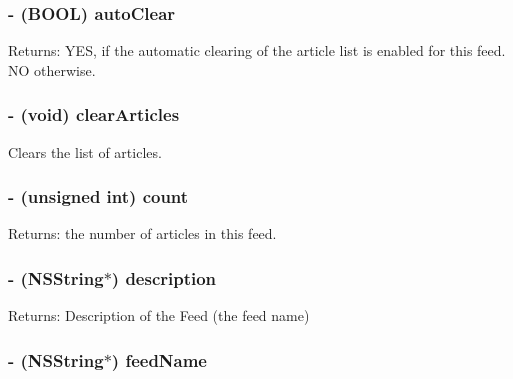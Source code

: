 \subsubsection{\setlength{\rightskip}{0pt plus 5cm}- (BOOL) auto\-Clear }\label{interfaceRSSFeed_a15}


\begin{Desc}
\item[Returns:]YES, if the automatic clearing of the article list is enabled for this feed. NO otherwise.\end{Desc}
\subsubsection{\setlength{\rightskip}{0pt plus 5cm}- (void) clear\-Articles }\label{interfaceRSSFeed_a16}


Clears the list of articles.
\subsubsection{\setlength{\rightskip}{0pt plus 5cm}- (unsigned int) count }\label{interfaceRSSFeed_a7}


\begin{Desc}
\item[Returns:]the number of articles in this feed.\end{Desc}
\subsubsection{\setlength{\rightskip}{0pt plus 5cm}- (NSString$\ast$) description }\label{interfaceRSSFeed_a2}


\begin{Desc}
\item[Returns:]Description of the Feed (the feed name)\end{Desc}
\subsubsection{\setlength{\rightskip}{0pt plus 5cm}- (NSString$\ast$) feed\-Name }\label{interfaceRSSFeed_a10}


